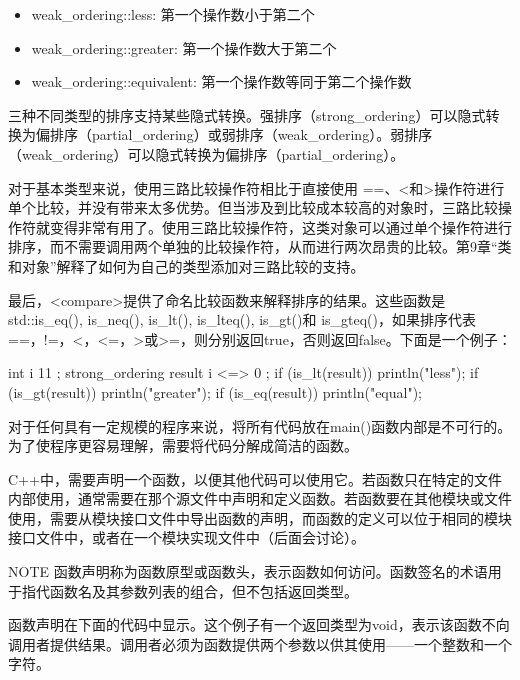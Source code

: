 \begin{itemize}
\item
weak\_ordering::less: 第一个操作数小于第二个

\item
weak\_ordering::greater: 第一个操作数大于第二个

\item
weak\_ordering::equivalent: 第一个操作数等同于第二个操作数
\end{itemize}

三种不同类型的排序支持某些隐式转换。强排序（strong\_ordering）可以隐式转换为偏排序（partial\_ordering）或弱排序（weak\_ordering）。弱排序（weak\_ordering）可以隐式转换为偏排序（partial\_ordering）。

对于基本类型来说，使用三路比较操作符相比于直接使用 ==、<和>操作符进行单个比较，并没有带来太多优势。但当涉及到比较成本较高的对象时，三路比较操作符就变得非常有用了。使用三路比较操作符，这类对象可以通过单个操作符进行排序，而不需要调用两个单独的比较操作符，从而进行两次昂贵的比较。第9章“类和对象”解释了如何为自己的类型添加对三路比较的支持。

最后，<compare>提供了命名比较函数来解释排序的结果。这些函数是std::is\_eq(), is\_neq(), is\_lt(), is\_lteq(), is\_gt()和 is\_gteq()，如果排序代表==，!=，<，<=，>或>=，则分别返回true，否则返回false。下面是一个例子：

\begin{cpp}
int i { 11 };
strong_ordering result { i <=> 0 };
if (is_lt(result)) { println("less"); }
if (is_gt(result)) { println("greater"); }
if (is_eq(result)) { println("equal"); }
\end{cpp}


对于任何具有一定规模的程序来说，将所有代码放在main()函数内部是不可行的。为了使程序更容易理解，需要将代码分解成简洁的函数。

C++中，需要声明一个函数，以便其他代码可以使用它。若函数只在特定的文件内部使用，通常需要在那个源文件中声明和定义函数。若函数要在其他模块或文件使用，需要从模块接口文件中导出函数的声明，而函数的定义可以位于相同的模块接口文件中，或者在一个模块实现文件中（后面会讨论）。

\begin{myNotic}{NOTE}
函数声明称为函数原型或函数头，表示函数如何访问。函数签名的术语用于指代函数名及其参数列表的组合，但不包括返回类型。
\end{myNotic}

函数声明在下面的代码中显示。这个例子有一个返回类型为void，表示该函数不向调用者提供结果。调用者必须为函数提供两个参数以供其使用——一个整数和一个字符。

